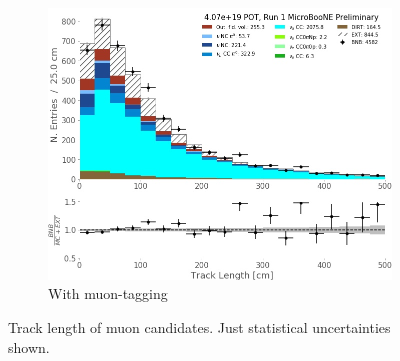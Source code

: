 \begin{figure}[H]
\begin{center}
\begin{subfigure}[b]{0.3\textwidth}
    \end{subfigure} %
    \begin{subfigure}[b]{0.3\textwidth}
    \centering
    \includegraphics[width=1.00\textwidth]{NuMuCCsel/Images/Ryan/Run1_trklen_fullsel.jpg}
    \caption{\label{fig:NuMUCCsel:ryan:trklenFull}  With muon-tagging}
    \end{subfigure}
\caption{Track length of muon candidates. Just statistical uncertainties shown.}
\end{center}
\end{figure}

